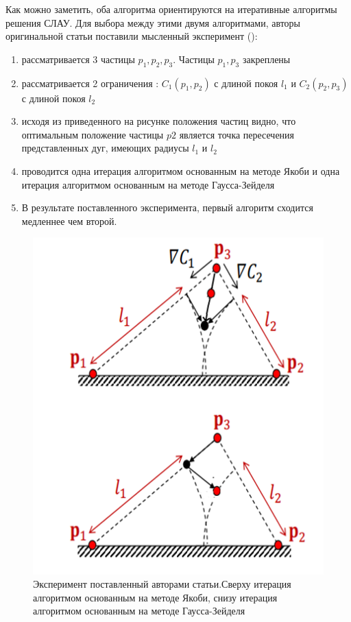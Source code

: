 	Как можно заметить, оба алгоритма ориентируются на итеративные алгоритмы решения СЛАУ. Для выбора между этими двумя алгоритмами, авторы оригинальной статьи поставили мысленный эксперимент ():
	
	\begin{enumerate}[1.]
		\item рассматривается 3 частицы $p_1, p_2, p_3$. Частицы $p_1, p_3$ закреплены
		\item рассматривается 2 ограничения : $C_1(p_1, p_2)$ с длиной покоя $l_1$ и $C_2(p_2, p_3)$ с длиной покоя $l_2$
		\item исходя из приведенного на рисунке положения частиц видно, что оптимальным положение частицы $p2$ является точка пересечения представленных дуг, имеющих радиусы $l_1$ и $l_2$
		\item проводится одна итерация алгоритмом основанным на методе Якоби и одна итерация алгоритмом основанным на методе Гаусса-Зейделя
		\item В результате поставленного эксперимента, первый алгоритм сходится медленнее чем второй.
	\end{enumerate}
		
	\begin{figure}[h!] 
		\center
		\includegraphics [scale=0.5] {my_folder/images//jacobi_vs_gauss}
		\caption{Эксперимент поставленный авторами статьи.\newline Сверху итерация алгоритмом основанным на методе Якоби, снизу итерация алгоритмом основанным на методе Гаусса-Зейделя}
		\label{fig:jacobi_vs_gauss}  
	\end{figure}
	
